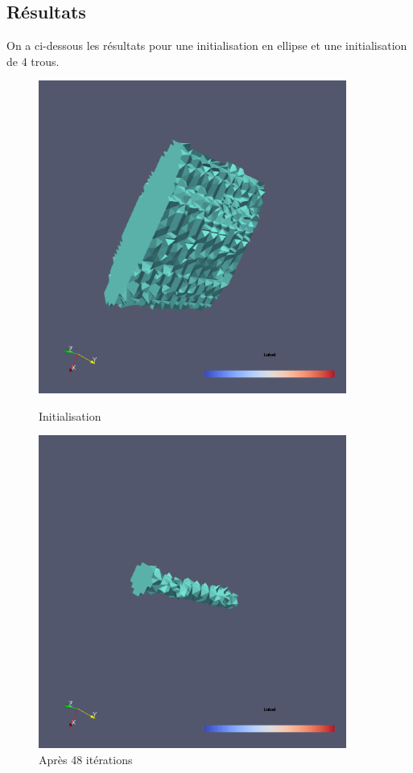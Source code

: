 \documentclass[11pt,a4paper]{article}
\begin{document}
\subsection*{Résultats}
On a ci-dessous les résultats pour une initialisation en ellipse et une initialisation de 4 trous.
\begin{figure}[H]
	\begin{minipage}{0.45\textwidth}
		\includegraphics[width=0.9\textwidth]{SansEl3DdistVraieiniEllipseINI.png}
		\caption{Initialisation}
	\end{minipage}	
	\begin{minipage}{0.45\textwidth}
		\includegraphics[width=0.9\textwidth]{SansEl3DdistVraieiniEllipseResit48.png}
		\caption{Après 48 itérations}
	\end{minipage}	
\end{figure}
\end{document}
